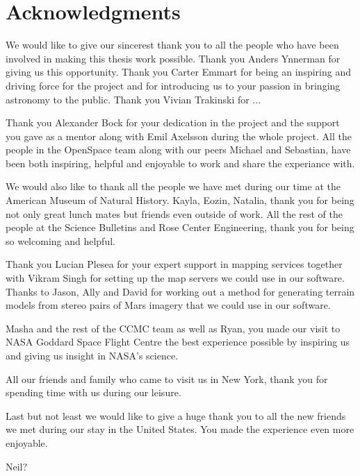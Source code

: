 \cleardoublepage
{}
{}
\chapter*{Acknowledgments}

We would like to give our sincerest thank you to all the people who have been involved in making this thesis work possible. Thank you Anders Ynnerman for giving us this opportunity. Thank you Carter Emmart for being an inspiring and driving force for the project and for introducing us to your passion in bringing astronomy to the public. Thank you Vivian Trakinski for ...

Thank you Alexander Bock for your dedication in the project and the support you gave as a mentor along with Emil Axelsson during the whole project. All the people in the OpenSpace team along with our peers Michael and Sebastian, have been both inspiring, helpful and enjoyable to work and share the experiance with.

We would also like to thank all the people we have met during our time at the American Museum of Natural History. Kayla, Eozin, Natalia, thank you for being not only great lunch mates but friends even outside of work.
All the rest of the people at the Science Bulletins and Rose Center Engineering, thank you for being so welcoming and helpful.

Thank you Lucian Plesea for your expert support in mapping services together with Vikram Singh for setting up the map servers we could use in our software. Thanks to Jason, Ally and David for working out a method for generating terrain models from stereo pairs of Mars imagery that we could use in our software.

Masha and the rest of the CCMC team as well as Ryan, you made our visit to NASA Goddard Space Flight Centre the best experience possible by inspiring us and giving us insight in NASA's science.

All our friends and family who came to visit us in New York, thank you for spending time with us during our leisure.

Last but not least we would like to give a huge thank you to all the new friends we met during our stay in the United States. You made the experience even more enjoyable.

Neil?

\newpage
